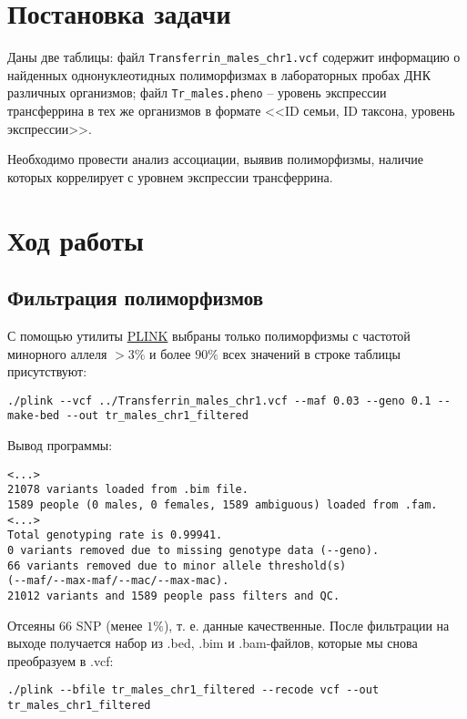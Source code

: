 \documentclass[a4paper,12pt]{article}
\begin{document}


\section{Постановка задачи}

Даны две таблицы: файл \texttt{Transferrin\_males\_chr1.vcf} содержит информацию о найденных однонуклеотидных полиморфизмах в лабораторных пробах ДНК различных организмов; файл \texttt{Tr\_males.pheno} -- уровень экспрессии трансферрина в тех же организмов в формате <<ID семьи, ID таксона, уровень экспрессии>>.

Необходимо провести анализ ассоциации, выявив полиморфизмы, наличие которых коррелирует с уровнем экспрессии трансферрина.

\section{Ход работы}

\subsection{Фильтрация полиморфизмов}

С помощью утилиты \href{https://zzz.bwh.harvard.edu/plink/download.shtml}{PLINK} выбраны только полиморфизмы с частотой минорного аллеля $ >3\% $ и более $90\%$ всех значений в строке таблицы присутствуют:

\begin{lstlisting}
./plink --vcf ../Transferrin_males_chr1.vcf --maf 0.03 --geno 0.1 --make-bed --out tr_males_chr1_filtered
\end{lstlisting}

Вывод программы:

\begin{verbatim}
<...>
21078 variants loaded from .bim file.
1589 people (0 males, 0 females, 1589 ambiguous) loaded from .fam.
<...>
Total genotyping rate is 0.99941.
0 variants removed due to missing genotype data (--geno).
66 variants removed due to minor allele threshold(s)
(--maf/--max-maf/--mac/--max-mac).
21012 variants and 1589 people pass filters and QC.
\end{verbatim}

Отсеяны 66 SNP (менее $1\%$), т. е. данные качественные.
После фильтрации на выходе получается набор из .bed, .bim и .bam-файлов, которые мы снова преобразуем в .vcf:

\begin{lstlisting}
./plink --bfile tr_males_chr1_filtered --recode vcf --out tr_males_chr1_filtered
\end{lstlisting}
\end{document}
